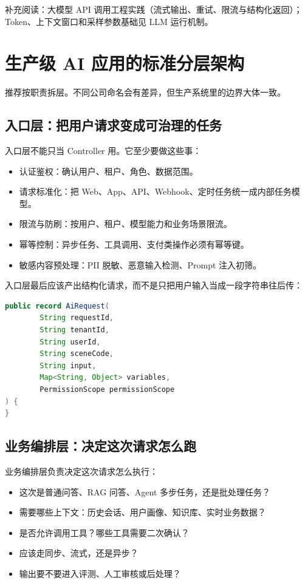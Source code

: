 \documentclass[9pt,a4paper,twocolumn]{ctexart}
\begin{document}
补充阅读：大模型 API 调用工程实践（流式输出、重试、限流与结构化返回）；Token、上下文窗口和采样参数基础见 LLM 运行机制。



\section*{生产级 AI 应用的标准分层架构}


推荐按职责拆层。不同公司命名会有差异，但生产系统里的边界大体一致。



\subsection*{入口层：把用户请求变成可治理的任务}


入口层不能只当 Controller 用。它至少要做这些事：


\begin{itemize}[itemsep=1pt, topsep=2pt]
  \item 认证鉴权：确认用户、租户、角色、数据范围。
  \item 请求标准化：把 Web、App、API、Webhook、定时任务统一成内部任务模型。
  \item 限流与防刷：按用户、租户、模型能力和业务场景限流。
  \item 幂等控制：异步任务、工具调用、支付类操作必须有幂等键。
  \item 敏感内容预处理：PII 脱敏、恶意输入检测、Prompt 注入初筛。
\end{itemize}


入口层最后应该产出结构化请求，而不是只把用户输入当成一段字符串往后传：



\begin{lstlisting}[language=Java]
public record AiRequest(
        String requestId,
        String tenantId,
        String userId,
        String sceneCode,
        String input,
        Map<String, Object> variables,
        PermissionScope permissionScope
) {
}
\end{lstlisting}



\subsection*{业务编排层：决定这次请求怎么跑}


业务编排层负责决定这次请求怎么执行：


\begin{itemize}[itemsep=1pt, topsep=2pt]
  \item 这次是普通问答、RAG 问答、Agent 多步任务，还是批处理任务？
  \item 需要哪些上下文：历史会话、用户画像、知识库、实时业务数据？
  \item 是否允许调用工具？哪些工具需要二次确认？
  \item 应该走同步、流式，还是异步？
  \item 输出要不要进入评测、人工审核或后处理？
\end{itemize}
\end{document}

